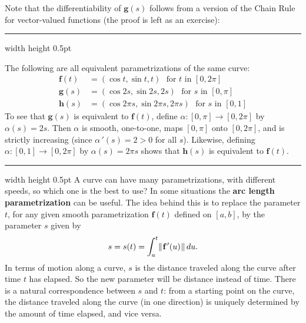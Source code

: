 Note that the differentiability of $\textbf{g}(s)$ follows from a version of the Chain Rule for vector-valued
functions (the proof is left as an exercise):

\vspace{2mm}
\hrule width \textwidth height 0.5pt
\begin{exmp}\label{exmp:paramhelix}
 The following are all equivalent parametrizations of the same curve:
 \begin{align*}
  \textbf{f}(t) &= (\cos t , \sin t , t) \text{~~for $t$ in~$[0,2\pi]$}\\
  \textbf{g}(s) &= (\cos 2s , \sin 2s , 2s) \text{~~for $s$ in~$[0,\pi]$}\\
  \textbf{h}(s) &= (\cos 2\pi s , \sin 2\pi s , 2\pi s) \text{~~for $s$ in~$[0,1]$}
 \end{align*}
 To see that $\textbf{g}(s)$ is equivalent to $\textbf{f}(t)$, define $\alpha:[0,\pi] \rightarrow [0,2\pi]$ by
 $\alpha(s) = 2s$. Then $\alpha$ is smooth, one-to-one, maps $[0,\pi]$ onto $[0,2\pi]$, and is strictly increasing
 (since $\alpha\,'(s) = 2 > 0$ for all $s$). Likewise, defining $\alpha:[0,1] \rightarrow [0,2\pi]$ by
 $\alpha(s) = 2\pi s$ shows that $\textbf{h}(s)$ is equivalent to $\textbf{f}(t)$.
\end{exmp}
\hrule width \textwidth height 0.5pt
\newpage
A curve can have many parametrizations, with different speeds, so which one is the best to use? In some situations
the \textbf{arc length parametrization} can be useful. The idea behind this is to replace the parameter $t$, for any
given smooth parametrization $\textbf{f}(t)$ defined on $[a,b]$, by the parameter $s$ given by
\begin{equation}\label{eqn:arclenfcn}
 s = s(t) = \int_{a}^{t} \lVert\mspace{1mu}\textbf{f}\,'(u)\mspace{1mu}\rVert\,du .
\end{equation}
In terms of motion along a curve, $s$ is the distance traveled along the curve after time $t$ has elapsed.
So the new parameter will be distance instead of time.
There is a natural correspondence between $s$ and $t$: from a starting point on the curve, the distance
traveled along the curve (in one direction) is uniquely determined by the amount of time elapsed, and vice versa.

